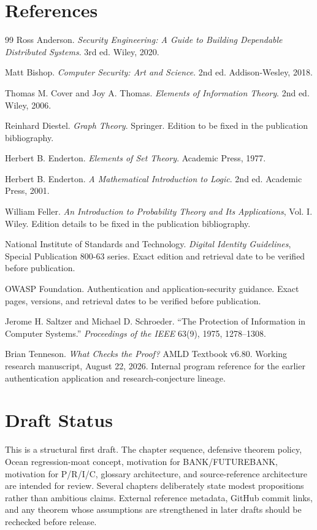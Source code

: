 \documentclass[11pt,oneside]{book}
\theoremstyle{definition}
\theoremstyle{remark}
\begin{document}
\chapter{References}
\label{app:references}
\begin{thebibliography}{99}
Ross Anderson. \emph{Security Engineering: A Guide to Building Dependable Distributed Systems}. 3rd ed. Wiley, 2020.

Matt Bishop. \emph{Computer Security: Art and Science}. 2nd ed. Addison-Wesley, 2018.

Thomas M. Cover and Joy A. Thomas. \emph{Elements of Information Theory}. 2nd ed. Wiley, 2006.

Reinhard Diestel. \emph{Graph Theory}. Springer. Edition to be fixed in the publication bibliography.

Herbert B. Enderton. \emph{Elements of Set Theory}. Academic Press, 1977.

Herbert B. Enderton. \emph{A Mathematical Introduction to Logic}. 2nd ed. Academic Press, 2001.

William Feller. \emph{An Introduction to Probability Theory and Its Applications}, Vol. I. Wiley. Edition details to be fixed in the publication bibliography.

National Institute of Standards and Technology. \emph{Digital Identity Guidelines}, Special Publication 800-63 series. Exact edition and retrieval date to be verified before publication.

OWASP Foundation. Authentication and application-security guidance. Exact pages, versions, and retrieval dates to be verified before publication.

Jerome H. Saltzer and Michael D. Schroeder. ``The Protection of Information in Computer Systems.'' \emph{Proceedings of the IEEE} 63(9), 1975, 1278--1308.

Brian Tenneson. \emph{What Checks the Proof?} AMLD Textbook v6.80. Working research manuscript, August 22, 2026. Internal program reference for the earlier authentication application and research-conjecture lineage.
\end{thebibliography}

\backmatter
\chapter*{Draft Status}
This is a structural first draft. The chapter sequence, defensive theorem policy, Ocean regression-moat concept, motivation for BANK/FUTUREBANK, motivation for P/R/I/C, glossary architecture, and source-reference architecture are intended for review. Several chapters deliberately state modest propositions rather than ambitious claims. External reference metadata, GitHub commit links, and any theorem whose assumptions are strengthened in later drafts should be rechecked before release.
\end{document}
